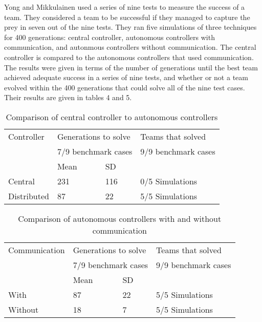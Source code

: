 \documentclass[12pt]{article} %
\begin{document}
Yong and Mikkulainen used a series of nine tests to measure the success of a team. They considered a team to be successful if they managed to capture the prey in seven out of the nine tests. They ran five simulations of three techniques for 400 generations: central controller, autonomous controllers with communication, and autonmous controllers without communication. The central controller is compared to the autonomous controllers that used communication. The results were given in terms of the number of generations until the best team achieved adequate success in a series of nine tests, and whether or not a team evolved within the 400 generations that could solve all of the nine test cases. Their results are given in tables 4 and 5.

\begin{table}
    \begin{tabular}{|l|l|l|l|}
    \hline
    Controller & \multicolumn{2}{l|}{Generations to solve} & Teams that solved    \\
    ~             & \multicolumn{2}{l|}{7/9 benchmark cases} &  9/9 benchmark cases \\ \hline
    ~           & Mean                                            & SD  & ~                                            \\ \hline
    Central     & 231                                             & 116 & 0/5 Simulations                              \\ \hline
    Distributed & 87                                              & 22  & 5/5 Simulations                              \\ \hline
    \end{tabular}
    \caption {Comparison of central controller to autonomous controllers}
\end{table}

\begin{table}
    \begin{tabular}{|l|l|l|l|}
    \hline
   Communication & \multicolumn{2}{l|}{Generations to solve} & Teams that solved    \\
    ~             & \multicolumn{2}{l|}{7/9 benchmark cases} &  9/9 benchmark cases \\ \hline
    ~             & Mean                                            & SD & ~                                            \\ \hline
    With          & 87                                              & 22 & 5/5 Simulations                              \\ \hline
    Without       & 18                                              & 7  & 5/5 Simulations                              \\ \hline
    \end{tabular}
    \caption {Comparison of autonomous controllers with and without communication}
\end{table}
\end{document}

